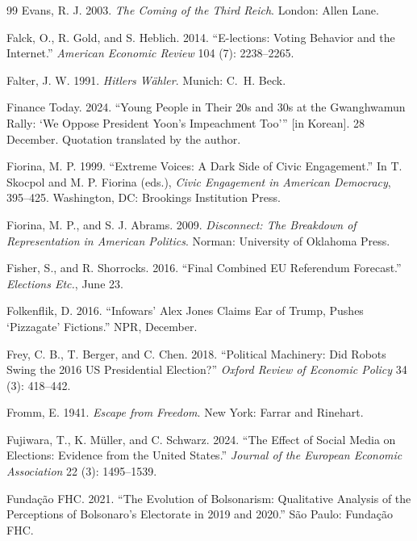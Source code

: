 \documentclass[12pt,letterpaper]{article}
\begin{document}
\begin{thebibliography}{99}
Evans, R. J. 2003. \textit{The Coming of the Third Reich}. London: Allen Lane.

Falck, O., R. Gold, and S. Heblich. 2014. ``E-lections: Voting Behavior and the Internet.'' \textit{American Economic Review} 104 (7): 2238--2265.

Falter, J. W. 1991. \textit{Hitlers W\"{a}hler}. Munich: C.~H. Beck.

Finance Today. 2024. ``Young People in Their 20s and 30s at the Gwanghwamun Rally: `We Oppose President Yoon's Impeachment Too''' [in Korean]. 28 December. Quotation translated by the author.

Fiorina, M. P. 1999. ``Extreme Voices: A Dark Side of Civic Engagement.'' In T. Skocpol and M. P. Fiorina (eds.), \textit{Civic Engagement in American Democracy}, 395--425. Washington, DC: Brookings Institution Press.

Fiorina, M. P., and S. J. Abrams. 2009. \textit{Disconnect: The Breakdown of Representation in American Politics}. Norman: University of Oklahoma Press.

Fisher, S., and R. Shorrocks. 2016. ``Final Combined EU Referendum Forecast.'' \textit{Elections Etc.}, June 23.

Folkenflik, D. 2016. ``Infowars' Alex Jones Claims Ear of Trump, Pushes `Pizzagate' Fictions.'' NPR, December.

Frey, C. B., T. Berger, and C. Chen. 2018. ``Political Machinery: Did Robots Swing the 2016 US Presidential Election?'' \textit{Oxford Review of Economic Policy} 34 (3): 418--442.

Fromm, E. 1941. \textit{Escape from Freedom}. New York: Farrar and Rinehart.

Fujiwara, T., K. M\"{u}ller, and C. Schwarz. 2024. ``The Effect of Social Media on Elections: Evidence from the United States.'' \textit{Journal of the European Economic Association} 22 (3): 1495--1539.

Funda\c{c}\~{a}o FHC. 2021. ``The Evolution of Bolsonarism: Qualitative Analysis of the Perceptions of Bolsonaro's Electorate in 2019 and 2020.'' S\~{a}o Paulo: Funda\c{c}\~{a}o FHC.


\end{thebibliography}
\end{document}
